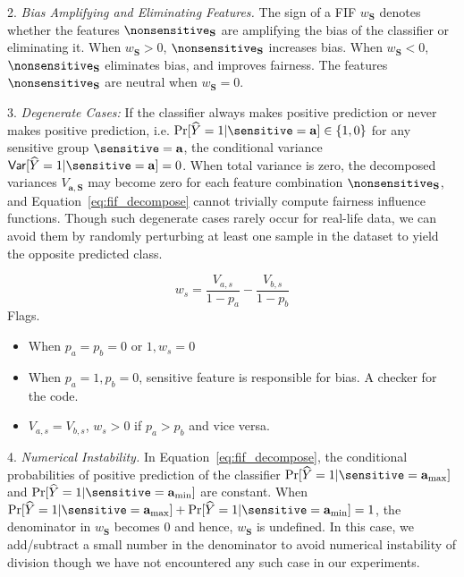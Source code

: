2. \textit{Bias Amplifying and Eliminating Features.} The sign of a FIF $ w_{\mathbf{S}} $ denotes whether the features $ \nonsensitive_{\mathbf{S}} $ are amplifying the bias of the classifier or eliminating it. When $ w_{\mathbf{S}} > 0 $, $ \nonsensitive_{\mathbf{S}} $ increases bias. When $ w_{\mathbf{S}} < 0 $, $ \nonsensitive_{\mathbf{S}} $ eliminates bias, and improves fairness. The features $ \nonsensitive_{\mathbf{S}} $ are neutral when $ w_{\mathbf{S}} = 0 $.

3. \textit{Degenerate Cases:} If the classifier always makes positive prediction or never makes positive prediction, i.e. $ \Pr[\widehat{Y} = 1 | \sensitive = \mathbf{a}] \in \{1, 0\} $ for any sensitive group $ \sensitive = \mathbf{a} $, the conditional variance $ \mathsf{Var}[\widehat{Y} = 1 | \sensitive = \mathbf{a}]  = 0 $. When total variance is zero, the decomposed variances $V_{\mathbf{a},\mathbf{S}}$ may become zero for each feature combination $\nonsensitive_\mathbf{S}$, and Equation~\eqref{eq:fif_decompose} cannot trivially compute fairness influence functions. Though such degenerate cases rarely occur for real-life data, we can avoid them by randomly perturbing at least one sample in the dataset to yield the opposite predicted class.

\[
w_s = \frac{V_{a, s}}{1 - p_a} - \frac{V_{b, s}}{1 - p_b}
\]
\red{[Corollary:]}
Flags.
\begin{itemize}
	\item When $ p_a = p_b = 0 \text{ or } 1,  w_s = 0 $
	\item When $ p_{a} = 1,  p_b = 0  $, sensitive feature is responsible for bias. A checker for the code.
	\item $ V_{a, s} = V_{b, s} $, $ w_s  > 0$ if $ p_a > p_b $ and vice versa.
\end{itemize}


4. \textit{Numerical Instability.} In Equation~\eqref{eq:fif_decompose}, the conditional probabilities of positive prediction of the classifier $ \Pr[\widehat{Y} = 1 | \sensitive = \mathbf{a}_{\max}]  $ and $ \Pr[\widehat{Y} = 1 | \sensitive = \mathbf{a}_{\min}]  $ are constant. When $ \Pr[\widehat{Y} = 1 | \sensitive = \mathbf{a}_{\max}] + \Pr[\widehat{Y} = 1 | \sensitive = \mathbf{a}_{\min}]   = 1 $, the denominator in $ w_{\mathbf{S}} $ becomes $ 0 $ and hence, $ w_{\mathbf{S}} $ is undefined. In this case, we add/subtract a small number in the denominator to avoid numerical instability of division though we have not encountered any such case in our experiments.%


